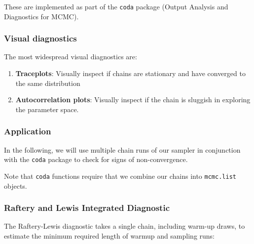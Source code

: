 \documentclass[
  11pt,
]{article}
\providecommand{\tightlist}{%
  \setlength{\itemsep}{0pt}\setlength{\parskip}{0pt}}
\begin{document}
These are implemented as part of the \texttt{coda} package (Output Analysis and
Diagnostics for MCMC).

\hypertarget{visual-diagnostics}{%
\subsubsection{Visual diagnostics}\label{visual-diagnostics}}

The most widespread visual diagnostics are:

\begin{enumerate}
\def\labelenumi{\arabic{enumi}.}
\tightlist
\item
  \textbf{Traceplots}: Visually inspect if chains are stationary and have
  converged to the same distribution
\item
  \textbf{Autocorrelation plots}: Visually inspect if the chain is sluggish
  in exploring the parameter space.
\end{enumerate}

\hypertarget{application-1}{%
\subsubsection{Application}\label{application-1}}

In the following, we will use multiple chain runs of our sampler in
conjunction with the \texttt{coda} package to check for signs of
non-convergence.

Note that \texttt{coda} functions require that we combine our chains into
\texttt{mcmc.list} objects.

\hypertarget{raftery-and-lewis-integrated-diagnostic}{%
\subsubsection{Raftery and Lewis Integrated Diagnostic}\label{raftery-and-lewis-integrated-diagnostic}}

The Raftery-Lewis diagnostic takes a single chain, including warm-up
draws, to estimate the minimum required length of warmup and sampling
runs:
\end{document}
